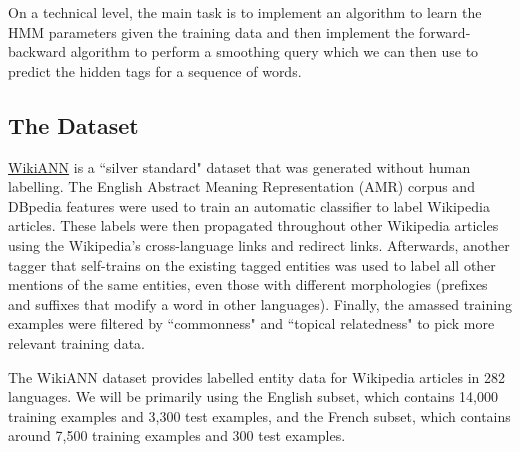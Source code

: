 \documentclass[11pt,addpoints,answers]{exam}
\begin{document}
On a technical level, the main task is to implement an algorithm to learn the HMM parameters given the training data and then implement the forward-backward algorithm to perform a smoothing query which we can then use to predict the hidden tags for a sequence of words. 

\subsection{The Dataset}\label{dataset}
\href{https://aclanthology.org/P17-1178.pdf}{WikiANN} is a ``silver standard" dataset that was generated without human labelling. The English Abstract Meaning Representation (AMR) corpus and DBpedia features were used to train an automatic classifier to label Wikipedia articles. These labels were then propagated throughout other Wikipedia articles using the Wikipedia's cross-language links and redirect links. Afterwards, another tagger that self-trains on the existing tagged entities was used to label all other mentions of the same entities, even those with different morphologies (prefixes and suffixes that modify a word in other languages). Finally, the amassed training examples were filtered by ``commonness" and ``topical relatedness" to pick more relevant training data. 

The WikiANN dataset provides labelled entity data for Wikipedia articles in 282 languages. We will be primarily using the English subset, which contains 14,000 training examples and 3,300 test examples, and the French subset, which contains around 7,500 training examples and 300 test examples. 

\clearpage
\end{document}
